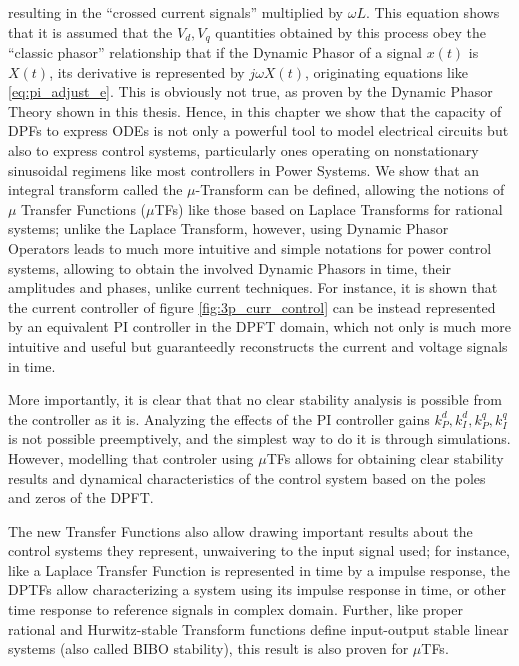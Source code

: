 	\noindent resulting in the ``crossed current signals'' multiplied by $\omega L$. This equation shows that it is assumed that the $V_d,V_q$ quantities obtained by this process obey the ``classic phasor'' relationship that if the Dynamic Phasor of a signal $x(t)$ is $X(t)$, its derivative is represented by $j\omega X(t)$, originating equations like \eqref{eq:pi_adjust_e}. This is obviously not true, as proven by the Dynamic Phasor Theory shown in this thesis. 
	Hence, in this chapter we show that the capacity of DPFs to express ODEs is not only a powerful tool to model electrical circuits but also to express control systems, particularly ones operating on nonstationary sinusoidal regimens like most controllers in Power Systems. We show that an integral transform called the $\mu$-Transform can be defined, allowing the notions of $\mu$ Transfer Functions ($\mu$TFs) like those based on Laplace Transforms for rational systems; unlike the Laplace Transform, however, using Dynamic Phasor Operators leads to much more intuitive and simple notations for power control systems, allowing to obtain the involved Dynamic Phasors in time, their amplitudes and phases, unlike current techniques. For instance, it is shown that the current controller of figure \ref{fig:3p_curr_control} can be instead represented by an equivalent PI controller in the DPFT domain, which not only is much more intuitive and useful but guaranteedly reconstructs the current and voltage signals in time.

	More importantly, it is clear that that no clear stability analysis is possible from the controller as it is. Analyzing the effects of the PI controller gains $k_P^d,k_I^d,k_P^q,k_I^q$ is not possible preemptively, and the simplest way to do it is through simulations. However, modelling that controler using $\mu$TFs allows for obtaining clear stability results and dynamical characteristics of the control system based on the poles and zeros of the DPFT.

	The new Transfer Functions also allow drawing important results about the control systems they represent, unwaivering to the input signal used; for instance, like a Laplace Transfer Function is represented in time by a impulse response, the DPTFs allow characterizing a system using its impulse response in time, or other time response to reference signals in complex domain. Further, like proper rational and Hurwitz-stable Transform functions define input-output stable linear systems (also called BIBO stability), this result is also proven for $\mu$TFs.

